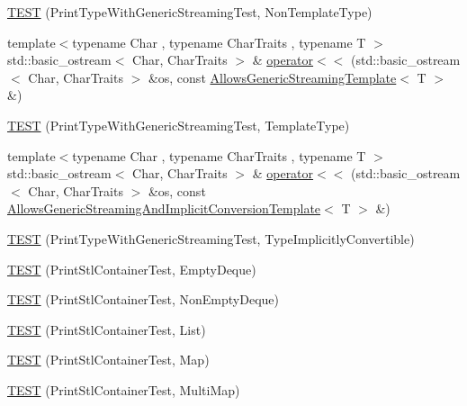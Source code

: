 \begin{DoxyCompactItemize}
\item 
\hyperlink{namespacetesting_1_1gtest__printers__test_a9272037c799c4779e1d79476dad66cb6}{T\+E\+S\+T} (Print\+Type\+With\+Generic\+Streaming\+Test, Non\+Template\+Type)
\item 
{\footnotesize template$<$typename Char , typename Char\+Traits , typename T $>$ }\\std\+::basic\+\_\+ostream$<$ Char, Char\+Traits $>$ \& \hyperlink{namespacetesting_1_1gtest__printers__test_a5464168e925b1adf29986c8e544e908e}{operator$<$$<$} (std\+::basic\+\_\+ostream$<$ Char, Char\+Traits $>$ \&os, const \hyperlink{classtesting_1_1gtest__printers__test_1_1_allows_generic_streaming_template}{Allows\+Generic\+Streaming\+Template}$<$ T $>$ \&)
\item 
\hyperlink{namespacetesting_1_1gtest__printers__test_a6e180c85f307712a995985f7bc735fd1}{T\+E\+S\+T} (Print\+Type\+With\+Generic\+Streaming\+Test, Template\+Type)
\item 
{\footnotesize template$<$typename Char , typename Char\+Traits , typename T $>$ }\\std\+::basic\+\_\+ostream$<$ Char, Char\+Traits $>$ \& \hyperlink{namespacetesting_1_1gtest__printers__test_a09eedfbca613302efe6438d2a537f419}{operator$<$$<$} (std\+::basic\+\_\+ostream$<$ Char, Char\+Traits $>$ \&os, const \hyperlink{classtesting_1_1gtest__printers__test_1_1_allows_generic_streaming_and_implicit_conversion_template}{Allows\+Generic\+Streaming\+And\+Implicit\+Conversion\+Template}$<$ T $>$ \&)
\item 
\hyperlink{namespacetesting_1_1gtest__printers__test_a68877c5e1ec7a53281798310c30e1776}{T\+E\+S\+T} (Print\+Type\+With\+Generic\+Streaming\+Test, Type\+Implicitly\+Convertible)
\item 
\hyperlink{namespacetesting_1_1gtest__printers__test_a1ce10b8a3634e0f6bfbfbb5888c04a95}{T\+E\+S\+T} (Print\+Stl\+Container\+Test, Empty\+Deque)
\item 
\hyperlink{namespacetesting_1_1gtest__printers__test_a249d482cf4a1525bd043489dcbd3e200}{T\+E\+S\+T} (Print\+Stl\+Container\+Test, Non\+Empty\+Deque)
\item 
\hyperlink{namespacetesting_1_1gtest__printers__test_aaa135672ff79ecaef82c6046f2ab8d29}{T\+E\+S\+T} (Print\+Stl\+Container\+Test, List)
\item 
\hyperlink{namespacetesting_1_1gtest__printers__test_a3d701a1866f260a42411e9041894c49c}{T\+E\+S\+T} (Print\+Stl\+Container\+Test, Map)
\item 
\hyperlink{namespacetesting_1_1gtest__printers__test_a8a498c956a5b1c0358d126e1ad56fac0}{T\+E\+S\+T} (Print\+Stl\+Container\+Test, Multi\+Map)

\end{DoxyCompactItemize}
